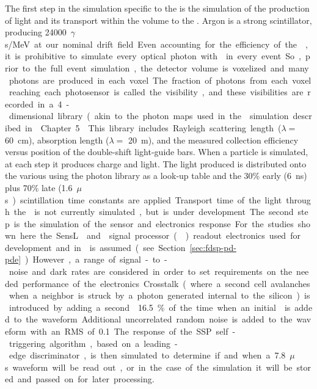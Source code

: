 The first step in the simulation specific to the  is the simulation of the production of light and its transport within the volume to the . Argon is a strong scintillator, producing \SI{24000}{$\gamma$s/MeV} at our nominal drift field. Even accounting for the efficiency of the , it is prohibitive to simulate every optical photon with  in every event. So, prior to the full event simulation, the detector volume is voxelized and many photons are produced in each voxel. The fraction of photons from each voxel reaching each photosensor is called the visibility, and these visibilities are recorded in a 4-dimensional library (akin to the photon maps used in the  simulation described in \voltitledp~Chapter 5.
This library includes Rayleigh scattering length ($\lambda=$ \SI{60}{cm}\cite{Grace:2015yta}), absorption length ($\lambda=$ \SI{20}{m}), and the measured collection efficiency versus position of the double-shift light-guide bars. When a particle is simulated, at each step it produces charge and light. The light produced is distributed onto the various  using the photon library as a look-up table and the 30\% early (\SI{6}{ns}) plus 70\% late (\SI{1.6}{$\mu$s}) scintillation time constants are applied. Transport time of the light through the \lar is not currently simulated, but is under development.

The second step is the simulation of the sensor and electronics response. For the studies shown here the SensL  and  signal processor () readout electronics used for  development and in  is assumed (see Section~\ref{sec:fdsp-pd-pde}). However, a range of signal-to-noise and dark rates are considered in order to set requirements on the needed performance of the electronics.
Crosstalk (where a second cell avalanches when a neighbor is struck by a photon generated internal to the silicon) is introduced by adding a second \phel \num{16.5}\% of the time when an initial \phel is added to the waveform. Additional uncorrelated random noise is added to the waveform with an RMS of %
\SI{0.1}{\phel}. The response of the SSP self-triggering algorithm, based on a leading-edge discriminator, is then simulated to determine if and when a \SI{7.8}{$\mu$s} waveform will be read out, or in the case of the simulation it will be stored and passed on for later processing.

